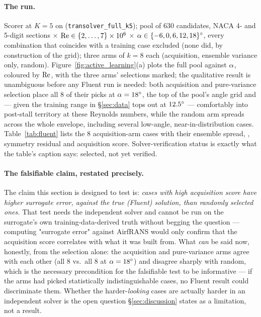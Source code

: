 \documentclass[11pt,a4paper]{article}
\begin{document}
\paragraph{The run.} Scorer \Mtrans{} at $K=5$ on 
(\texttt{transolver\_full\_k5}); pool of 630 candidates, NACA 4- and 5-digit
sections $\times$ $\mathrm{Re}\in\{2,\dots,7\}\times10^6$ $\times$ $\alpha\in\{-6,0,6,12,18\}^{\circ}$,
every combination that coincides with a training case excluded (none did, by
construction of the grid); three arms of $k=8$ each (acquisition, ensemble
variance only, random). Figure~\ref{fig:active_learning}(a) plots the full pool
against $\alpha$, coloured by $\mathrm{Re}$, with the three arms' selections marked; the
qualitative result is unambiguous before any Fluent run is needed: both
acquisition and pure-variance selection place all 8 of their picks at
$\alpha=18^{\circ}$, the top of the pool's angle grid and --- given the training
range in \S\ref{sec:data} tops out at $12.5^{\circ}$ --- comfortably into
post-stall territory at these Reynolds numbers, while the random arm spreads
across the whole envelope, including several low-angle, near-in-distribution
cases. Table~\ref{tab:fluent} lists the 8 acquisition-arm cases with their
ensemble spread, \FSC, symmetry residual and acquisition score.
Solver-verification status is exactly what the table's caption says: selected,
not yet verified.



\paragraph{The falsifiable claim, restated precisely.} The claim this section
is designed to test is: \emph{cases with high acquisition score have higher
surrogate error, against the true (Fluent) solution, than randomly selected
ones.} That test needs the independent solver and cannot be run on the
surrogate's own training-data-derived truth without begging the question ---
computing "surrogate error" against AirfRANS would only confirm that the
acquisition score correlates with what it was built from. What \emph{can} be
said now, honestly, from the selection alone: the acquisition and
pure-variance arms agree with each other (all 8 vs.\ all 8 at
$\alpha=18^{\circ}$) and disagree sharply with random, which is the necessary
precondition for the falsifiable test to be informative --- if the arms had
picked statistically indistinguishable cases, no Fluent result could
discriminate them. Whether the harder-\emph{looking} cases are actually harder
in an independent solver is the open question \S\ref{sec:discussion} states as
a limitation, not a result.
\end{document}
